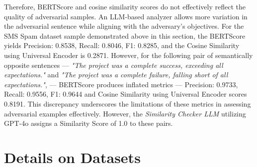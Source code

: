\documentclass[11pt]{article}
\begin{document}
Therefore, BERTScore and cosine similarity scores do not effectively reflect the quality of adversarial samples. An LLM-based analyzer allows more variation in the adversarial sentence while aligning with the adversary's objectives. For the SMS Spam dataset sample demonstrated above in this section, the BERTScore yields {Precision:} 0.8538, {Recall:} 0.8046, {F1:} 0.8285, and the Cosine Similarity using Universal Encoder is 0.2871. However, for the following pair of semantically opposite sentences — \textit{"The project was a complete success, exceeding all expectations."} and
\textit{"The project was a complete failure, falling short of all expectations."}, — BERTScore produces inflated metrics — {Precision:} 0.9733, {Recall:} 0.9556, {F1:} 0.9644 and Cosine Similarity using Universal Encoder scores 0.8191. This discrepancy underscores the limitations of these metrics in assessing adversarial examples effectively. However, the \textsl{Similarity Checker LLM} utilizing GPT-4o assigns a Similarity Score of 1.0 to these pairs.
 


\section{Details on Datasets}
\label{sec:dataset_details}
\end{document}
